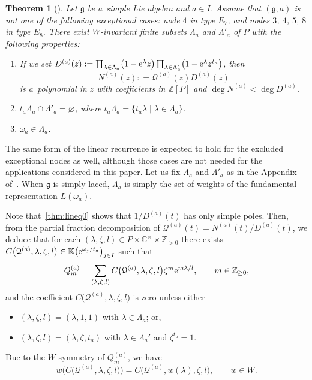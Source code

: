 \documentclass[pdftex]{sigma}
\numberwithin{equation}{section}
\newtheorem{Theorem}{Theorem}[section]
\theoremstyle{definition}
\newcommand{\Z}{\mathbb{Z}}
\newcommand{\C}{\mathbb{C}}
\newcommand{\K}{\mathbb{K}}
\newcommand{\g}{\mathfrak{g}}
\newcommand\Qam{Q^{(a)}_{m}}
\newcommand\Qa{\mathcal{Q}^{(a)}}
\newcommand\La{\Lambda}
\newcommand\la{\lambda}
\begin{document}
\begin{Theorem}[{\cite[Theorem 1.1]{MR3948941}}]\label{thm:linQ}
Let $\g$ be a~simple Lie algebra and $a\in I$.
Assume that $(\g,a)$ is not one of the following exceptional cases: node $4$ in type $E_7$, and nodes $3$, $4$, $5$, $8$ in type $E_8$.
There exist $W$-invariant finite subsets $\La_a$ and $\La'_a$ of $P$ with the following properties:
\begin{enumerate}[label=$(\roman*)$, ref=$(\roman*)$]\itemsep=0pt
\item If we set $D^{(a)}(z) : = \prod_{\la\in \La_a}\bigl(1-{\rm e}^{\la}z\bigr)\prod_{\la\in \La_a'}\bigl(1-{\rm e}^{\la}z^{t_a}\bigr)$, then
\begin{equation}\label{eqn:Qgen}
N^{(a)}(z): = \Qa(z)D^{(a)}(z)
\end{equation}
is a~polynomial in $z$ with coefficients in $\Z[P]$ and $\deg N^{(a)}<\deg D^{(a)}$.
\item \label{thm:lineq0} $t_a\La_{a}\cap \La'_{a}=\varnothing$, where $t_a\La_{a}=\{t_a \la\mid \la \in \La_a\}$.
\item $\omega_a\in \La_a$.
\end{enumerate}
\end{Theorem}
The same form of the linear recurrence is expected to hold for the excluded exceptional nodes as well, although those cases are not needed for the applications considered in this paper.
Let us fix $\La_a$ and $\La'_a$ as in the Appendix of~\cite{MR3948941}. When $\g$ is simply-laced, $\La_a$ is simply the set of weights of the fundamental representation $L(\omega_a)$.

Note that~\ref{thm:lineq0} shows that $1/D^{(a)}(t)$ has only simple poles.
Then, from the partial fraction decomposition of $\Qa(t)=N^{(a)}(t)/D^{(a)}(t)$, we deduce that for each $(\la,\zeta,l)\in P\times \C^{\times} \times \Z_{>0}$ there exists $C\bigl(\Qa,\la,\zeta,l\bigr)\in \K\bigl({\rm e}^{\omega_j/{t_a}}\bigr)_{j\in I}$ such that
\begin{equation}\label{eq:QandC0}
\Qam =\sum_{(\la,\zeta,l)} C\bigl(\Qa,\la,\zeta,l\bigr)\zeta^m {\rm e}^{m \la/l}, \qquad m\in \Z_{\geq 0},
\end{equation}
and the coefficient $C\bigl(\Qa,\la,\zeta,l\bigr)$ is zero unless either
\begin{itemize}\itemsep=0pt
\item $(\la,\zeta,l)=(\la,1,1)$ with $\la\in \La_a$; or,
\item $(\la,\zeta,l)=(\la,\zeta,t_a)$ with $\la\in \La_a'$ and $\zeta^{t_a}=1$.
\end{itemize}
Due to the $W$-symmetry of $\Qam$, we have
\begin{equation}\label{eqn:RWsym}
w\bigl(C\bigl(\Qa,\la,\zeta,l\bigr)\bigr)= C\bigl(\Qa,w(\la),\zeta,l\bigr),\qquad w\in W.
\end{equation}
\end{document}
